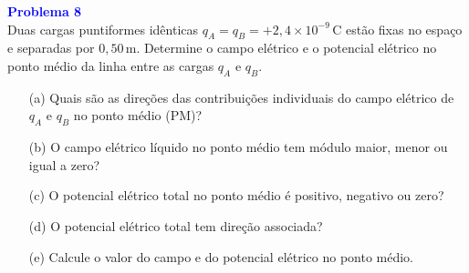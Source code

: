 \documentclass[a4paper,12pt]{article}
\begin{document}
\begin{flushleft}
\textbf{\textcolor{blue}{\Large Problema 8}}\\

Duas cargas puntiformes idênticas \( q_A = q_B = +2{,}4 \times 10^{-9} \, \text{C} \) estão 
fixas no espaço e separadas por \( 0{,}50 \, \text{m} \). Determine o campo elétrico e o potencial 
elétrico no ponto médio da linha entre as cargas \( q_A \) e \( q_B \).

\begin{enumerate}
    \item[(a)] Quais são as direções das contribuições individuais do campo elétrico de \( q_A \) e \( q_B \) no ponto médio (PM)?
    \item[(b)] O campo elétrico líquido no ponto médio tem módulo maior, menor ou igual a zero?
    \item[(c)] O potencial elétrico total no ponto médio é positivo, negativo ou zero?
    \item[(d)] O potencial elétrico total tem direção associada?
    \item[(e)] Calcule o valor do campo e do potencial elétrico no ponto médio.
\end{enumerate}

\begin{center}
\end{center}
\end{flushleft}
\end{document}

